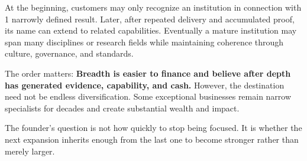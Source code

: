 At the beginning, customers may only recognize an institution in connection with 1 narrowly defined result. Later, after repeated delivery and accumulated proof, its name can extend to related capabilities. Eventually a mature institution may span many disciplines or research fields while maintaining coherence through culture, governance, and standards.

The order matters: \textbf{Breadth is easier to finance and believe after depth has generated evidence, capability, and cash.} However, the destination need not be endless diversification. Some exceptional businesses remain narrow specialists for decades and create substantial wealth and impact.

The founder's question is not how quickly to stop being focused. It is whether the next expansion inherits enough from the last one to become stronger rather than merely larger.
